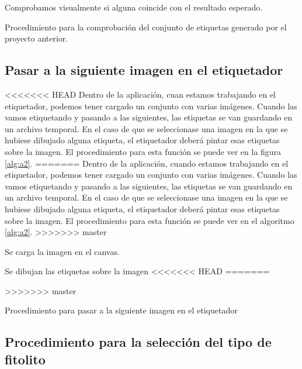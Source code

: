 \begin{algorithm}
Comprobamos visualmente si alguna coincide con el resultado esperado.
	\caption{Procedimiento para la comprobación del conjunto de etiquetas generado por el proyecto anterior.}
	\label{alg:a1}
\end{algorithm}

\subsection{Pasar a la siguiente imagen en el etiquetador}
<<<<<<< HEAD
Dentro de la aplicación, cuan estamos trabajando en el etiquetador, podemos tener cargado un conjunto con varias imágenes.
Cuando las vamos etiquetando y pasando a las siguientes, las etiquetas se van guardando en un archivo temporal. En el caso de que se seleccionase una imagen en la que se hubiese dibujado alguna etiqueta, el etiquetador deberá pintar esas etiquetas sobre la imagen.
El procedimiento para esta función se puede ver en la figura \ref{alg:a2}.
=======
Dentro de la aplicación, cuando estamos trabajando en el etiquetador, podemos tener cargado un conjunto con varias imágenes.
Cuando las vamos etiquetando y pasando a las siguientes, las etiquetas se van guardando en un archivo temporal. En el caso de que se seleccionase una imagen en la que se hubiese dibujado alguna etiqueta, el etiquetador deberá pintar esas etiquetas sobre la imagen.
El procedimiento para esta función se puede ver en el algoritmo \ref{alg:a2}.
>>>>>>> master


\begin{algorithm}
	{
		Se carga la imagen en el canvas.
		
		{
			Se dibujan las etiquetas sobre la imagen
<<<<<<< HEAD
=======
			
			
>>>>>>> master
		}
		
	}
	\caption{Procedimiento para pasar a la siguiente imagen en el etiquetador}
	\label{alg:a2}
\end{algorithm}

\subsection{Procedimiento para la selección del tipo de fitolito}

